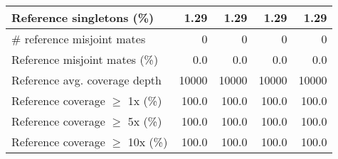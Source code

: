 \documentclass[12pt,a4paper]{article}
\begin{document}
\begin{table}[ht]
\begin{center}
\begin{tabular}{|l*{4}{|r}|}
Reference singletons (\%) & 1.29 & 1.29 & 1.29 & 1.29 \\ \hline
\# reference misjoint mates & 0 & 0 & 0 & 0 \\ \hline
Reference misjoint mates (\%) & 0.0 & 0.0 & 0.0 & 0.0 \\ \hline
Reference avg. coverage depth & 10000 & 10000 & 10000 & 10000 \\ \hline
Reference coverage $\geq$ 1x (\%) & 100.0 & 100.0 & 100.0 & 100.0 \\ \hline
Reference coverage $\geq$ 5x (\%) & 100.0 & 100.0 & 100.0 & 100.0 \\ \hline
Reference coverage $\geq$ 10x (\%) & 100.0 & 100.0 & 100.0 & 100.0 \\ \hline
\end{tabular}
\end{center}
\end{table}
\end{document}
